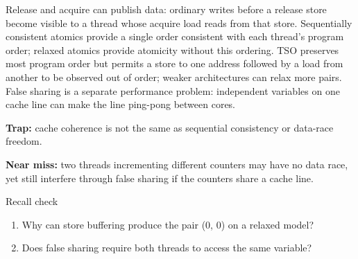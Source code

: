 \documentclass[11pt]{article}
\begin{document}
\begin{keepsection}
Release and acquire can publish data: ordinary writes before a release store become visible to a thread whose acquire load reads from that store. Sequentially consistent atomics provide a single order consistent with each thread’s program order; relaxed atomics provide atomicity without this ordering. TSO preserves most program order but permits a store to one address followed by a load from another to be observed out of order; weaker architectures can relax more pairs. False sharing is a separate performance problem: independent variables on one cache line can make the line ping-pong between cores.

\begin{notebox}\textbf{Trap:} cache coherence is not the same as sequential consistency or data-race freedom.\end{notebox}

\begin{notebox}\textbf{Near miss:} two threads incrementing different counters may have no data race, yet still interfere through false sharing if the counters share a cache line.\end{notebox}

\begin{recallbox}{Recall check}
\begin{enumerate}
\item Why can store buffering produce the pair (0, 0) on a relaxed model?
\item Does false sharing require both threads to access the same variable?
\end{enumerate}

\end{recallbox}
\end{keepsection}
\end{document}
